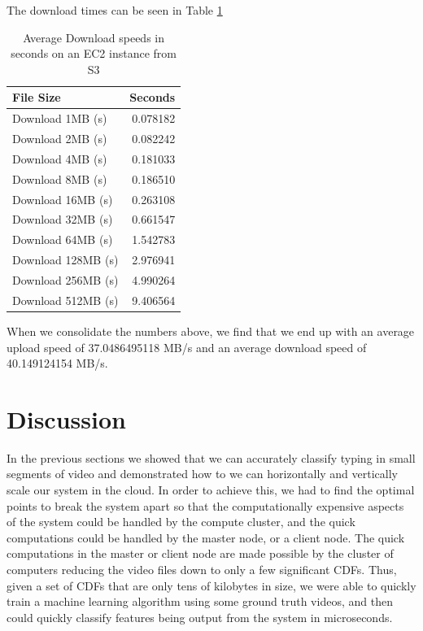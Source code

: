 The download times can be seen in Table \ref{tab:download_speed}
\begin{table}[h]
  \begin{tabular}{lr}
  \toprule
  {File Size} &         Seconds \\
  \midrule
  Download 1MB (s)   &  0.078182 \\
  Download 2MB (s)   &  0.082242 \\
  Download 4MB (s)   &  0.181033 \\
  Download 8MB (s)   &  0.186510 \\
  Download 16MB (s)  &  0.263108 \\
  Download 32MB (s)  &  0.661547 \\
  Download 64MB (s)  &  1.542783 \\
  Download 128MB (s) &  2.976941 \\
  Download 256MB (s) &  4.990264 \\
  Download 512MB (s) &  9.406564 \\
  \bottomrule
  \end{tabular}
\caption{Average Download speeds in seconds on an EC2 instance from S3}
\label{tab:download_speed}
\end{table}


When we consolidate the numbers above, we find that we end up with an average
upload speed of 37.0486495118 MB/s and an average download speed of 40.149124154 MB/s.

\FloatBarrier

\section{Discussion}
In the previous sections we showed that we can accurately classify typing in
small segments of video and demonstrated how to we can horizontally and vertically
scale our system in the cloud. In order to achieve this, we had to find the
optimal points to break the system apart so that the computationally
expensive aspects of the system could be handled by the compute cluster, and the
quick computations could be handled by the master node, or a client node.
The quick computations in the master or client node are made possible by the
cluster of computers reducing the video files down to only a few significant
CDFs. Thus, given a set of CDFs that are only tens of kilobytes in size, we
were able to quickly train a machine learning algorithm using some ground truth
videos, and then could quickly classify features being output from the system
in microseconds.

